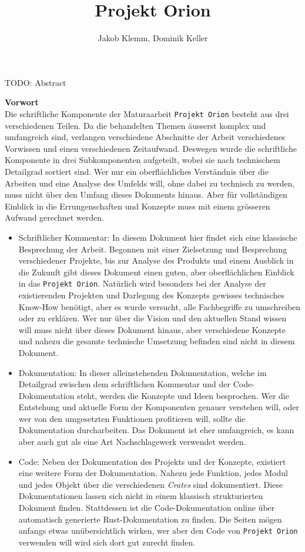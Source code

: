 \documentclass[11pt]{article}
\author{Jakob Klemm, Dominik Keller}
\date{}
\title{Projekt Orion}
\begin{document}
\maketitle
\tableofcontents

\newpage  
\begin{ABSTRACT}
TODO: Abstract
\end{ABSTRACT}
\newpage

\textbf{Vorwort}\\
Die schriftliche Komponente der Maturaarbeit \texttt{Projekt Orion} besteht aus
drei verschiedenen Teilen. Da die behandelten Themen äusserst komplex
und umfangreich sind, verlangen verschiedene Abschnitte der Arbeit
verschiedenes Vorwissen und einen verschiedenen Zeitaufwand. Deswegen
wurde die schriftliche Komponente in drei Subkomponenten aufgeteilt,
wobei sie nach technischem Detailgrad sortiert sind. Wer nur ein
oberflächliches Verständnis über die Arbeiten und eine Analyse des
Umfelds will, ohne dabei zu technisch zu werden, muss nicht über den
Umfang dieses Dokuments hinaus. Aber für vollständigen Einblick in die
Errungenschaften und Konzepte muss mit einem grösseren Aufwand
gerechnet werden.
\begin{itemize}
\item Schriftlicher Kommentar: In diesem Dokument hier findet sich eine
klassische Besprechung der Arbeit. Begonnen mit einer Zielsetzung
und Besprechung verschiedener Projekte, bis zur Analyse des Produkts
und einem Ausblick in die Zukunft gibt dieses Dokument einen guten,
aber oberflächlichen Einblick in das \texttt{Projekt Orion}. Natürlich wird
besonders bei der Analyse der existierenden Projekten und Darlegung
des Konzepts gewisses technisches Know-How benötigt, aber es wurde
versucht, alle Fachbegriffe zu umschreiben oder zu erklären. Wer nur
über die Vision und den aktuellen Stand wissen will muss nicht über
dieses Dokument hinaus, aber verschiedene Konzepte und nahezu die
gesamte technische Umsetzung befinden sind nicht in diesem Dokument.
\item Dokumentation: In dieser alleinstehenden Dokumentation, welche im
Detailgrad zwischen dem schriftlichen Kommentar und der
Code-Dokumentation steht, werden die Konzepte und Ideen besprochen.
Wer die Entstehung und aktuelle Form der Komponenten genauer
verstehen will, oder wer von den umgesetzten Funktionen profitieren
will, sollte die Dokumentation durcharbeiten. Das Dokument ist eher
umfangreich, es kann aber auch gut als eine Art Nachschlagewerk
verwendet werden.
\item Code: Neben der Dokumentation des Projekts und der Konzepte,
existiert eine weitere Form der Dokumentation. Nahezu jede Funktion,
jedes Modul und jedes Objekt über die verschiedenen \emph{Crates} sind
dokumentiert. Diese Dokumentationen lassen sich nicht in einem
klassisch strukturierten Dokument finden. Stattdessen ist die
Code-Dokumentation online über automatisch generierte
Rust-Dokumentation zu finden. Die Seiten mögen anfangs etwas
unübersichtlich wirken, wer aber den Code von \texttt{Projekt Orion}
verwenden will wird sich dort gut zurecht finden.
\end{itemize}
\newpage
\end{document}

